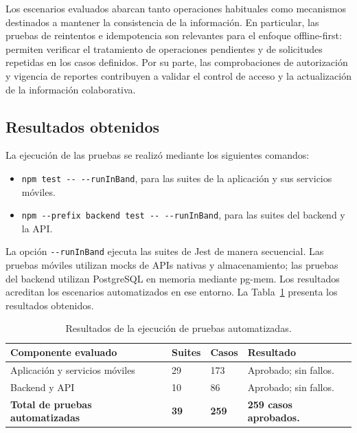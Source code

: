 Los escenarios evaluados abarcan tanto operaciones habituales como mecanismos destinados a mantener la consistencia de la información. En particular, las pruebas de reintentos e idempotencia son relevantes para el enfoque offline-first: permiten verificar el tratamiento de operaciones pendientes y de solicitudes repetidas en los casos definidos. Por su parte, las comprobaciones de autorización y vigencia de reportes contribuyen a validar el control de acceso y la actualización de la información colaborativa.

\subsection{Resultados obtenidos}

La ejecución de las pruebas se realizó mediante los siguientes comandos:

\begin{itemize}
    \item \verb|npm test -- --runInBand|, para las suites de la aplicación y sus servicios móviles.
    \item \verb|npm --prefix backend test -- --runInBand|, para las suites del backend y la API.
\end{itemize}

La opción \verb|--runInBand| ejecuta las suites de Jest de manera secuencial. Las pruebas móviles utilizan mocks de APIs nativas y almacenamiento; las pruebas del backend utilizan PostgreSQL en memoria mediante pg-mem. Los resultados acreditan los escenarios automatizados en ese entorno. La Tabla~\ref{tab:resultados-pruebas} presenta los resultados obtenidos.

\begin{table}[H]
\centering
\small
\setlength{\tabcolsep}{4pt}
\renewcommand{\arraystretch}{1.15}
\begin{tabular}{|p{5.8cm}|p{2cm}|p{2.4cm}|p{4cm}|}
\hline
\textbf{Componente evaluado} & \textbf{Suites} & \textbf{Casos} & \textbf{Resultado} \\
\hline
Aplicación y servicios móviles & 29 & 173 & Aprobado; sin fallos. \\
\hline
Backend y API & 10 & 86 & Aprobado; sin fallos. \\
\hline
\textbf{Total de pruebas automatizadas} & \textbf{39} & \textbf{259} & \textbf{259 casos aprobados.} \\
\hline
\end{tabular}
\caption{Resultados de la ejecución de pruebas automatizadas.}
\label{tab:resultados-pruebas}
\end{table}


